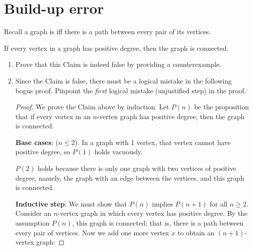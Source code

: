\documentclass[12pt]{article}
\begin{document}
\section{Build-up error}
Recall a graph is  iff there is a path between every pair of its vertices.

\begin{falseclm*}
If every vertex in a graph has positive degree, then the graph is
connected.
\end{falseclm*}

\begin{enumerate}

\item Prove that this Claim is indeed false by providing a
counterexample.


\item Since the Claim is false, there must be a logical mistake in the
following bogus proof.  Pinpoint the \emph{first} logical mistake
(unjustified step) in the proof.

\begin{proof}
  We prove the Claim above by induction.  Let $P(n)$ be the proposition
  that if every vertex in an $n$-vertex graph has positive degree, then
  the graph is connected.

\textbf{Base cases}: ($n \leq 2$).  In a graph with 1 vertex, that vertex
cannot have positive degree, so $P(1)$ holds vacuously.

$P(2)$ holds because there is only one graph with two vertices of positive
degree, namely, the graph with an edge between the vertices, and this
graph is connected.

\textbf{Inductive step}: We must show that $P(n)$ implies
$P(n+1)$ for all $n \geq 2$.  Consider an $n$-vertex graph in which every
vertex has positive degree.  By the assumption $P(n)$, this graph is
connected; that is, there is a path between every pair of vertices.  Now
we add one more vertex $x$ to obtain an $(n+1)$-vertex graph:


\end{proof}
\end{enumerate}
\end{document}
